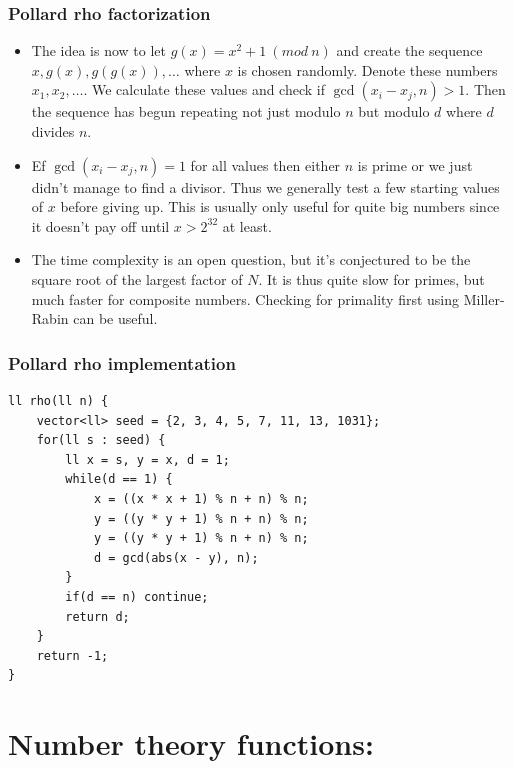 \documentclass{beamer}
\begin{document}
\begin{frame}[plain]
\frametitle{Pollard rho factorization}

\begin{itemize}

\item The idea is now to let $g(x) = x^2 + 1 \ (mod \ n)$ and create the sequence $x, g(x), g(g(x)), \dots$ where $x$ is chosen randomly. Denote these numbers $x_1, x_2, \dots$. We calculate these values and check if $\operatorname{gcd}(x_i - x_j, n) > 1$. Then the sequence has begun repeating not just modulo $n$ but modulo $d$ where $d$ divides $n$.

\item Ef $\operatorname{gcd}(x_i - x_j, n) = 1$ for all values then either $n$ is prime or we just didn't manage to find a divisor. Thus we generally test a few starting values of $x$ before giving up. This is usually only useful for quite big numbers since it doesn't pay off until $x > 2^{32}$ at least.

\item The time complexity is an open question, but it's conjectured to be the square root of the largest factor of $N$. It is thus quite slow for primes, but much faster for composite numbers. Checking for primality first using Miller-Rabin can be useful.

\end{itemize}

\end{frame}

\begin{frame}
\frametitle{Pollard rho implementation}

\begin{verbatim}
ll rho(ll n) {
    vector<ll> seed = {2, 3, 4, 5, 7, 11, 13, 1031};
    for(ll s : seed) {
        ll x = s, y = x, d = 1;
        while(d == 1) {
            x = ((x * x + 1) % n + n) % n;
            y = ((y * y + 1) % n + n) % n;
            y = ((y * y + 1) % n + n) % n;
            d = gcd(abs(x - y), n);
        }
        if(d == n) continue;
        return d;
    }
    return -1;
}
\end{verbatim}

\end{frame}

\section*{Number theory functions:}
\end{document}
